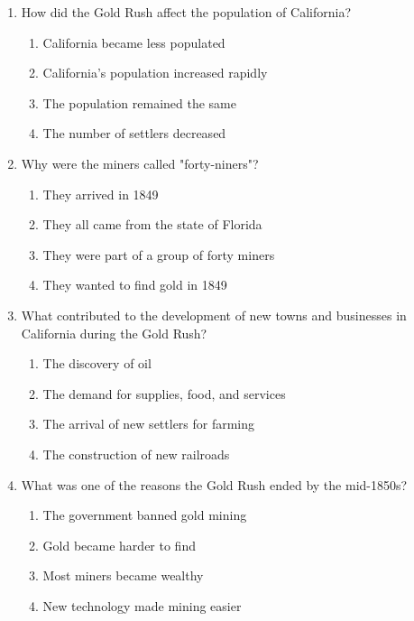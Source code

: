 \documentclass[12pt]{article}
\begin{document}
\begin{enumerate}
    \vspace{0.5cm}

    \item How did the Gold Rush affect the population of California?
    \begin{enumerate}[label=\Alph*.]
        \item California became less populated
        \item California's population increased rapidly
        \item The population remained the same
        \item The number of settlers decreased
    \end{enumerate}

    \vspace{0.5cm}

    \item Why were the miners called "forty-niners"?
    \begin{enumerate}[label=\Alph*.]
        \item They arrived in 1849
        \item They all came from the state of Florida
        \item They were part of a group of forty miners
        \item They wanted to find gold in 1849
    \end{enumerate}

    \vspace{0.5cm}

    \item What contributed to the development of new towns and businesses in California during the Gold Rush?
    \begin{enumerate}[label=\Alph*.]
        \item The discovery of oil
        \item The demand for supplies, food, and services
        \item The arrival of new settlers for farming
        \item The construction of new railroads
    \end{enumerate}

    \vspace{0.5cm}

    \item What was one of the reasons the Gold Rush ended by the mid-1850s?
    \begin{enumerate}[label=\Alph*.]
        \item The government banned gold mining
        \item Gold became harder to find
        \item Most miners became wealthy
        \item New technology made mining easier
    \end{enumerate}


\end{enumerate}
\end{document}
